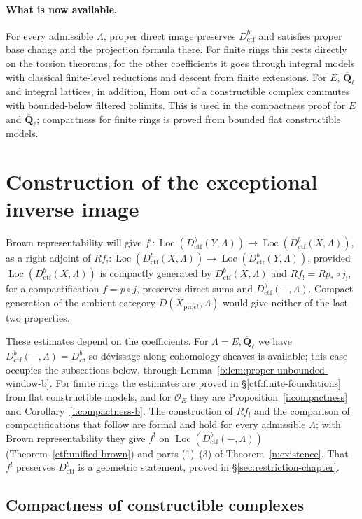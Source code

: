 \documentclass[11pt,a4paper]{article}
\numberwithin{equation}{section}
\theoremstyle{definition}
\theoremstyle{remark}
\newcommand{\Dbc}{D^b_c}
\newcommand{\Loc}{\operatorname{Loc}}
\newcommand{\Qbar}{\overline{\mathbf Q}_\ell}
\newcommand{\proet}{\mathrm{pro}\acute{e}t}
\newcommand{\Dctf}{D^b_{\mathrm{ctf}}}
\begin{document}
\paragraph*{What is now available.} For every admissible $\Lambda$,
proper direct image preserves $\Dctf$ and satisfies proper base change
and the projection formula there. For finite rings this rests directly
on the torsion theorems; for the other coefficients it goes through
integral models with classical finite-level reductions and descent from
finite extensions. For $E$, $\Qbar$ and integral lattices, in addition,
Hom out of a constructible complex commutes with bounded-below filtered
colimits.
This is used in the compactness proof for $E$ and $\Qbar$; compactness
for finite rings is proved from bounded flat constructible models.

\section{Construction of the exceptional inverse image}
\label{sec:formal-half}
Brown representability will give
$f^!\colon\Loc(\Dctf(Y,\Lambda))\to\Loc(\Dctf(X,\Lambda))$, as a right adjoint
of $Rf_!\colon\Loc(\Dctf(X,\Lambda))\to\Loc(\Dctf(Y,\Lambda))$, provided
$\Loc(\Dctf(X,\Lambda))$ is compactly generated by $\Dctf(X,\Lambda)$
and $Rf_!=Rp_*\circ j_!$, for a compactification $f=p\circ j$, preserves
direct sums and $\Dctf(-,\Lambda)$.
Compact generation of the ambient category $D(X_{\proet},\Lambda)$ would
give neither of the last two properties.

These estimates depend on the coefficients. For $\Lambda=E,\Qbar$ we
have $\Dctf(-,\Lambda)=\Dbc$, so d\'evissage along cohomology sheaves
is available; this case occupies the subsections below, through
Lemma~\ref{b:lem:proper-unbounded-window-b}. For finite rings the
estimates are proved in \S\ref{ctf:finite-foundations} from flat
constructible models, and for $\mathcal O_E$ they are
Proposition~\ref{i:compactness} and Corollary~\ref{i:compactness-b}.
The construction of $Rf_!$ and the comparison of compactifications that
follow are formal and hold for every admissible $\Lambda$; with Brown
representability they give $f^!$ on $\Loc(\Dctf(-,\Lambda))$
(Theorem~\ref{ctf:unified-brown}) and parts (1)--(3) of
Theorem~\ref{n:existence}. That $f^!$ preserves $\Dctf$ is a geometric
statement, proved in \S\ref{sec:restriction-chapter}.

\subsection{Compactness of constructible complexes}
\label{b:sec:compactness}
\end{document}
